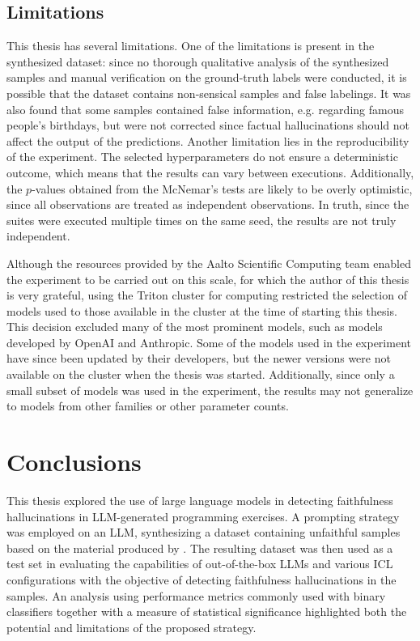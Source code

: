 \documentclass[english, 12pt, a4paper, sci, utf8, a-2b, online]{latex/definitions/aaltothesis}
\begin{document}

\subsection{Limitations} \label{sec:limitations}

This thesis has several limitations. One of the limitations is present in the synthesized dataset: since no thorough qualitative analysis of the synthesized samples and manual verification on the ground-truth labels were conducted, it is possible that the dataset contains non-sensical samples and false labelings. It was also found that some samples contained false information, e.g. regarding famous people's birthdays, but were not corrected since factual hallucinations should not affect the output of the predictions. Another limitation lies in the reproducibility of the experiment. The selected hyperparameters do not ensure a deterministic outcome, which means that the results can vary between executions. Additionally, the $p$-values obtained from the McNemar's tests are likely to be overly optimistic, since all observations are treated as independent observations. In truth, since the suites were executed multiple times on the same seed, the results are not truly independent.

Although the resources provided by the Aalto Scientific Computing team enabled the experiment to be carried out on this scale, for which the author of this thesis is very grateful, using the Triton cluster for computing restricted the selection of models used to those available in the cluster at the time of starting this thesis. This decision excluded many of the most prominent models, such as models developed by OpenAI and Anthropic. Some of the models used in the experiment have since been updated by their developers, but the newer versions were not available on the cluster when the thesis was started. Additionally, since only a small subset of models was used in the experiment, the results may not generalize to models from other families or other parameter counts. 

\clearpage

\section{Conclusions} \label{sec:conclusions}

This thesis explored the use of large language models in detecting faithfulness hallucinations in LLM-generated programming exercises. A prompting strategy was employed on an LLM, synthesizing a dataset containing unfaithful samples based on the material produced by \textcite{10.1145/3632620.3671103}. The resulting dataset was then used as a test set in evaluating the capabilities of out-of-the-box LLMs and various ICL configurations with the objective of detecting faithfulness hallucinations in the samples. An analysis using performance metrics commonly used with binary classifiers together with a measure of statistical significance highlighted both the potential and limitations of the proposed strategy.
\end{document}

